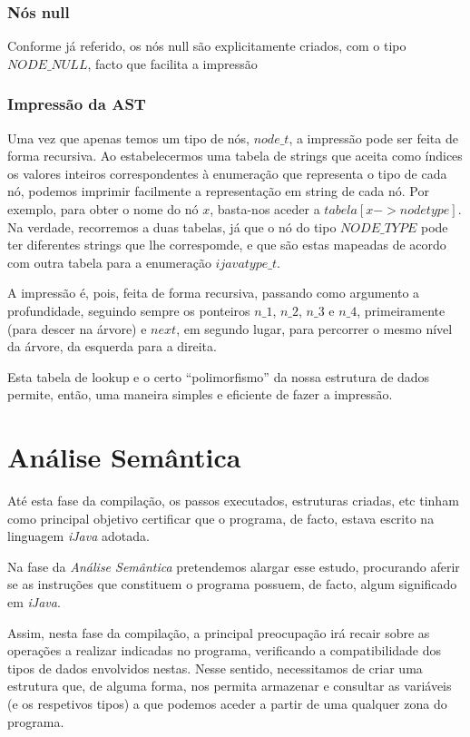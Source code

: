 \documentclass[11pt,a4paper]{article}
\begin{document}
\subsubsection{Nós null}

Conforme já referido, os nós null são explicitamente criados, com o tipo $NODE\_NULL$, facto que facilita a impressão

\subsubsection{Impressão da AST}

Uma vez que apenas temos um tipo de nós, $node\_t$, a impressão pode ser feita de forma recursiva. Ao estabelecermos uma tabela de strings que aceita como índices os valores inteiros correspondentes à enumeração que representa o tipo de cada nó, podemos imprimir facilmente a representação em string de cada nó. Por exemplo, para obter o nome do nó $x$, basta-nos aceder a $tabela[x->nodetype]$. Na verdade, recorremos a duas tabelas, já que o nó do tipo $NODE\_TYPE$ pode ter diferentes strings que lhe correspomde, e que são estas mapeadas de acordo com outra tabela para a enumeração $ijavatype\_t$.

A impressão é, pois, feita de forma recursiva, passando como argumento a profundidade, seguindo sempre os ponteiros $n\_1$, $n\_2$, $n\_3$ e $n\_4$, primeiramente (para descer na árvore) e $next$, em segundo lugar, para percorrer o mesmo nível da árvore, da esquerda para a direita.

Esta tabela de lookup e o certo ``polimorfismo'' da nossa estrutura de dados permite, então, uma maneira simples e eficiente de fazer a impressão.

\pagebreak

\section{Análise Semântica}

	Até esta fase da compilação, os passos executados, estruturas criadas, etc tinham como principal objetivo certificar que o programa, de facto, estava escrito na linguagem \emph{iJava} adotada.
	
	Na fase da \emph{Análise Semântica} pretendemos alargar esse estudo, procurando aferir se as instruções que constituem o programa possuem, de facto, algum significado em \emph{iJava}.
	
	Assim, nesta fase da compilação, a principal preocupação irá recair sobre as operações a realizar indicadas no programa, verificando a compatibilidade dos tipos de dados envolvidos nestas. Nesse sentido, necessitamos de criar uma estrutura que, de alguma forma, nos permita armazenar e consultar as variáveis (e os respetivos tipos) a que podemos aceder a partir de uma qualquer zona do programa.
	
\end{document}
